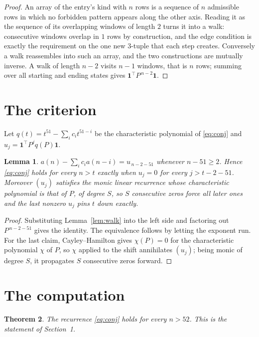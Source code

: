 \documentclass[11pt,a4paper]{article}
\theoremstyle{plain}
\newtheorem{theorem}{Theorem}
\newtheorem{lemma}[theorem]{Lemma}
\theoremstyle{definition}
\begin{document}
\begin{proof}
An array of the entry's kind with $n$ rows is a sequence of $n$ admissible rows in
which no forbidden pattern appears along the other axis. Reading it as the sequence of its
overlapping windows of length $2$ turns it into a walk: consecutive windows overlap in
$1$ rows by construction, and the edge condition is exactly the requirement on the one
new $3$-tuple that each step creates. Conversely a walk reassembles into such an array,
and the two constructions are mutually inverse. A walk of length $n-2$ visits $n-1$
windows, that is $n$ rows; summing over all starting and ending states gives
$\mathbf{1}^{\!\top}P^{\,n-2}\mathbf{1}$.
\end{proof}

\section{The criterion}

Let $q(t)=t^{51}-\sum_i c_i t^{51-i}$ be the characteristic polynomial of
\eqref{eq:conj} and $u_j=\mathbf{1}^{\!\top}P^{j}q(P)\mathbf{1}$.

\begin{lemma}\label{lem:crit}
$a(n)-\sum_i c_i a(n-i)=u_{\,n-2-51}$ whenever $n-51\ge2$. Hence
\eqref{eq:conj} holds for every $n>t$ exactly when $u_j=0$ for every
$j>t-2-51$. Moreover $(u_j)$ satisfies the monic linear recurrence whose
characteristic polynomial is that of $P$, of degree $S$, so $S$ consecutive zeros force all
later ones and the last nonzero $u_j$ pins $t$ down exactly.
\end{lemma}

\begin{proof}
Substituting Lemma~\ref{lem:walk} into the left side and factoring out
$P^{\,n-2-51}$ gives the identity. The equivalence follows by letting the exponent
run. For the last claim, Cayley--Hamilton gives $\chi(P)=0$ for the characteristic
polynomial $\chi$ of $P$, so $\chi$ applied to the shift annihilates $(u_j)$; being monic of
degree $S$, it propagates $S$ consecutive zeros forward.
\end{proof}

\section{The computation}

\begin{theorem}
The recurrence \eqref{eq:conj} holds for every $n>52$. This is the statement of
Section~1.
\end{theorem}
\end{document}
